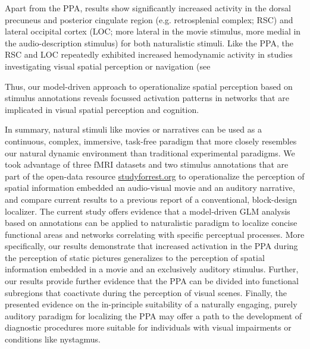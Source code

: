 \documentclass[english]{article}
\begin{document}


Apart from the PPA, results show significantly increased activity in the
dorsal precuneus and posterior cingulate region (e.g. retrosplenial complex;
RSC) and lateral occipital cortex (LOC; more lateral in the movie stimulus, more
medial in the audio-description stimulus) for both naturalistic stimuli.
Like the PPA, the RSC and LOC repeatedly exhibited increased hemodynamic activity
in studies investigating visual spatial perception or navigation (see

Thus, our model-driven approach to operationalize spatial perception based on stimulus
annotations reveals focussed activation patterns in networks that are implicated
in visual spatial perception and cognition.

In summary, natural stimuli like movies \citep{eickhoff2020towards,
hasson2008neurocinematics, sonkusare2019naturalistic} or narratives
\citep{hamilton2018revolution, honey2012not, lerner2011topographic,
silbert2014coupled, wilson2008beyond} can be used as a continuous, complex,
immersive, task-free paradigm that more closely resembles our natural dynamic
environment than traditional experimental paradigms.
We took advantage of three fMRI datasets and two stimulus annotations that are
part of the open-data resource
\href{http://www.studyforrest.org}{studyforrest.org} to operationalize the
perception of spatial information embedded an audio-visual movie and an
auditory narrative, and compare current results to a previous report of a
conventional, block-design localizer.
The current study offers evidence that a model-driven GLM analysis based on
annotations can be applied to naturalistic paradigm to localize concise
functional areas and networks correlating with specific perceptual processes.
More specifically, our results demonstrate that increased activation in the PPA
during the perception of static pictures generalizes to the perception of
spatial information embedded in a movie and an exclusively auditory stimulus.
Further, our results provide further evidence that the PPA can be divided into
functional subregions that coactivate during the perception of visual scenes.
Finally, the presented evidence on the in-principle suitability of a naturally
engaging, purely auditory paradigm for localizing the PPA may offer a path to
the development of diagnostic procedures more suitable for individuals with
visual impairments or conditions like nystagmus.
\end{document}

